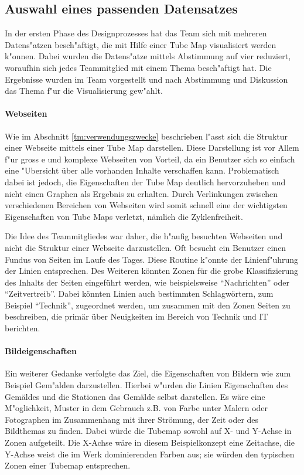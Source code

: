 \subsection{Auswahl eines passenden Datensatzes}
In der ersten Phase des Designprozesses hat das Team sich mit mehreren Datens"atzen besch"aftigt, die mit Hilfe einer Tube Map visualisiert werden k"onnen. Dabei wurden die Datens"atze mittels Abstimmung auf vier reduziert, woraufhin sich jedes Teammitglied mit einem Thema besch"aftigt hat. Die Ergebnisse wurden im Team vorgestellt und nach Abstimmung und Diskussion das Thema f"ur die Visualisierung gew"ahlt.

\paragraph{Webseiten}
Wie im Abschnitt \ref{tm:verwendungszwecke} beschrieben l"asst sich die Struktur einer Webseite mittels einer Tube Map darstellen.  Diese Darstellung ist vor Allem f"ur gross e und komplexe Webseiten von Vorteil, da ein Benutzer sich so einfach eine "Ubersicht über alle vorhanden Inhalte verschaffen kann. Problematisch dabei ist jedoch, die Eigenschaften der Tube Map deutlich hervorzuheben und nicht einen Graphen als Ergebnis zu erhalten. Durch Verlinkungen zwischen verschiedenen Bereichen von Webseiten wird somit schnell eine der wichtigsten Eigenschaften von Tube Maps verletzt, nämlich die Zyklenfreiheit.

Die Idee des Teammitgliedes war daher, die h"aufig besuchten Webseiten und nicht die Struktur einer Webseite darzustellen. Oft besucht ein Benutzer einen Fundus von Seiten im Laufe des Tages. Diese Routine k"onnte der Linienf"uhrung der Linien entsprechen. Des Weiteren könnten Zonen für die grobe Klassifizierung des Inhalts der Seiten eingeführt werden, wie beispielsweise "`Nachrichten"' oder "`Zeitvertreib"'. Dabei könnten Linien auch bestimmten Schlagwörtern, zum Beispiel "`Technik"', zugeordnet werden, um zusammen mit den Zonen Seiten zu beschreiben, die primär über Neuigkeiten im Bereich von Technik und IT berichten. 

\paragraph{Bildeigenschaften}
Ein weiterer Gedanke verfolgte das Ziel, die Eigenschaften von Bildern wie zum Beispiel Gem"alden darzustellen. Hierbei w"urden die Linien Eigenschaften des Gemäldes und die Stationen das Gemälde selbst darstellen. Es wäre eine M"oglichkeit, Muster in dem Gebrauch z.B. von Farbe unter Malern oder Fotographen im Zusammenhang mit ihrer Strömung, der Zeit oder des Bildthemas zu finden. Dabei würde die Tubemap sowohl auf X- und Y-Achse in Zonen aufgeteilt. Die X-Achse wäre in diesem Beispielkonzept eine Zeitachse, die Y-Achse weist die im Werk dominierenden Farben aus; sie würden den typischen Zonen einer Tubemap entsprechen.

